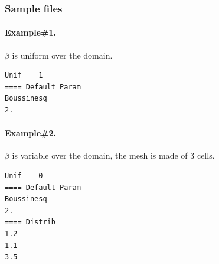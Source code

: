 \subsubsection{Sample files}
\paragraph*{Example\#1.} $\beta$ is uniform over the domain.
\begin{verbatim}
Unif	1
==== Default Param
Boussinesq
2.
\end{verbatim}
%
\paragraph*{Example\#2.} $\beta$ is variable over the domain, the mesh is made of 3 cells.
\begin{verbatim}
Unif	0
==== Default Param
Boussinesq
2.
==== Distrib
1.2
1.1
3.5
\end{verbatim}